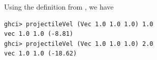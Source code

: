 Using the definition from , we have
\begin{lstlisting}
ghci> projectileVel (Vec 1.0 1.0 1.0) 1.0
vec 1.0 1.0 (-8.81)
ghci> projectileVel (Vec 1.0 1.0 1.0) 2.0
vec 1.0 1.0 (-18.62)
\end{lstlisting}
